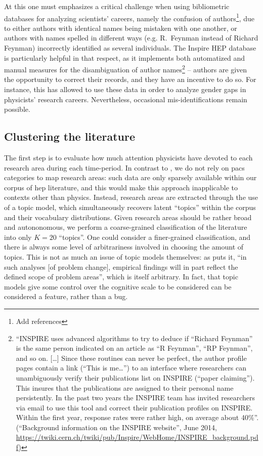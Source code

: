 \documentclass{article}
\begin{document}
At this one must emphasizes a critical challenge when using bibliometric databases for analyzing scientists' careers, namely the confusion of authors\footnote{Add references}, due to either authors with identical names being mistaken with one another, or authors with names spelled in different ways (e.g. R.~Feynman instead of Richard Feynman) incorrectly identified as several individuals. The Inspire HEP database is particularly helpful in that respect, as it implements both automatized and manual measures for the disambiguation of author names\footnote{``INSPIRE	 uses	 advanced	
algorithms	 to	 try	 to	 deduce	if	 “Richard	 Feynman”	is	 the	 same	 person indicated	 on	 an	
article	 as	 “R	 Feynman”,	 “RP	 Feynman”,	 and	 so	 on. [\dots] Since	 these	 routines	 can	 never	 be	 perfect,	 the	
author	profile	pages	contain	a	link	(“This	is	me…”)	to	an	interface	where	researchers	can	
unambiguously	verify	their	publications	list	on	INSPIRE (“paper	claiming”).	This	insures	
that	 the	publications	are	assigned	 to	 their	personal	name	persistently. In	 the	past	 two	
years	 the	 INSPIRE	 team	 has	invited	 researchers	 via	 email	 to	 use	 this	 tool	 and	 correct	
their	publication	profiles	on	 INSPIRE.	Within	the	 first	year,	response	rates	were	rather	
high,	on	average	about 40\%''. (``Background	information	on	the	INSPIRE	website'', June 2014, \url{https://twiki.cern.ch/twiki/pub/Inspire/WebHome/INSPIRE_background.pdf})} -- authors are given the opportunity to correct their records, and they have an incentive to do so. For instance, this has allowed \citet{Strumia2021} to use these data in order to analyze gender gaps in physicists' research careers. Nevertheless, occasional mis-identifications remain possible. 

\subsection{\label{sec:topics}Clustering the literature}

The first step is to evaluate how much attention physicists have devoted to each research area during each time-period. In contrast to \citet{Jia2017,Battiston2019,Aleta2019}, we do not rely on \gls{pacs} categories to map research areas: such data are only sparsely available within our corpus of \gls{hep} literature, and this would make this approach inapplicable to contexts other than physics. Instead, research areas are extracted through the use of a topic model, which simultaneously recovers latent ``topics'' within the corpus and their vocabulary distributions.  Given research areas should be rather broad and autononomous, we perform a coarse-grained classification of the literature into only $K=20$ ``topics''. One could consider a finer-grained classification, and there is always some level of arbitrariness involved in choosing the amount of topics. This is not as much an issue of topic models themselves: as \citet{Gieryn1978} puts it, ``in such analyses [of problem change], empirical findings will in part reflect the defined scope of problem areas'', which is itself arbitrary. In fact, that topic models give some control over the cognitive scale to be considered can be considered a feature, rather than a bug.
\end{document}
